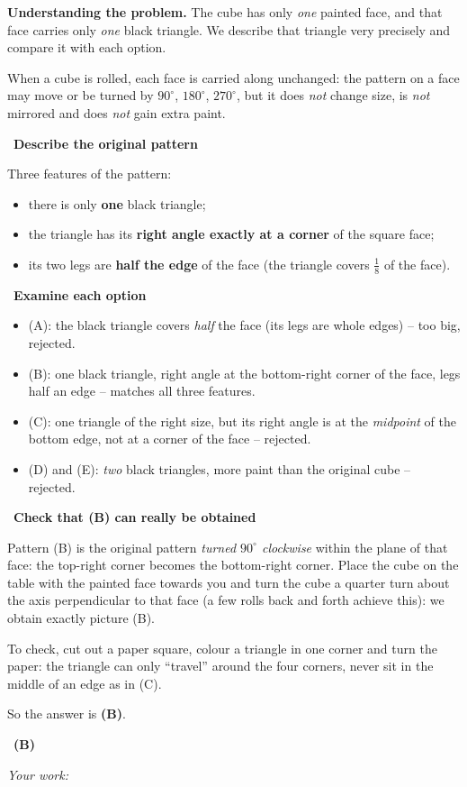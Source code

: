 \documentclass[11pt]{article}
\newif\ifsol \solfalse
\providecommand{\AnsWord}{Đáp số}
\newcommand{\ans}[1]{\par\smallskip{\bfseries\color{tmGreen!88!black}\AnsWord:}\ {\bfseries\color{AnsRed}#1}\par}
\newcommand{\probsol}[1]{%
  \begin{lrbox}{\solmeasure}\begin{minipage}{\dimexpr\linewidth-24pt\relax}#1\end{minipage}\end{lrbox}%
  \ifsol
    \begin{solbox}#1\end{solbox}%
  \else
    \setlength{\solht}{\dimexpr\ht\solmeasure+\dp\solmeasure+0.85cm\relax}%
    \ifdim\solht<1.35cm\setlength{\solht}{1.35cm}\fi
    \ifdim\solht>\StudentMaxWork\setlength{\solht}{\StudentMaxWork}\fi
    \begin{tcolorbox}[colback=white,colframe=Line,boxrule=0.8pt,arc=5pt,
      left=8pt,right=8pt,top=4pt,bottom=4pt,height=\solht]{\footnotesize\color{Slate}\itshape\WorkWord}\end{tcolorbox}%
  \fi}
\newlength{\StudentMaxWork}\setlength{\StudentMaxWork}{7.5cm}
\newcommand{\step}[2]{\par\smallskip\noindent{\bfseries\color{tmBlue!85!black}\StepWord~#1.}\ {\bfseries #2}\par\nopagebreak}
\def\WorkWord{Your work:}
\def\AnsWord{Answer}
\def\StepWord{Step}
\begin{document}
\probsol{
\textbf{Understanding the problem.} The cube has only \emph{one} painted face, and that face carries only \emph{one} black triangle. We describe that triangle very precisely and compare it with each option.
\begin{recallbox}When a cube is rolled, each face is carried along unchanged: the pattern on a face may move or be turned by $90^\circ$, $180^\circ$, $270^\circ$, but it does \emph{not} change size, is \emph{not} mirrored and does \emph{not} gain extra paint.\end{recallbox}
\step{1}{Describe the original pattern}
Three features of the pattern:
\begin{itemize}[leftmargin=1.3em,itemsep=0pt,topsep=0pt]
  \item there is only \textbf{one} black triangle;
  \item the triangle has its \textbf{right angle exactly at a corner} of the square face;
  \item its two legs are \textbf{half the edge} of the face (the triangle covers $\frac18$ of the face).
\end{itemize}

\step{2}{Examine each option}
\begin{itemize}[leftmargin=1.3em,itemsep=1pt,topsep=0pt]
  \item (A): the black triangle covers \emph{half} the face (its legs are whole edges) -- too big, rejected.
  \item (B): one black triangle, right angle at the bottom-right corner of the face, legs half an edge -- matches all three features.
  \item (C): one triangle of the right size, but its right angle is at the \emph{midpoint} of the bottom edge, not at a corner of the face -- rejected.
  \item (D) and (E): \emph{two} black triangles, more paint than the original cube -- rejected.
\end{itemize}

\step{3}{Check that (B) can really be obtained}
Pattern (B) is the original pattern \emph{turned $90^\circ$ clockwise} within the plane of that face: the top-right corner becomes the bottom-right corner. Place the cube on the table with the painted face towards you and turn the cube a quarter turn about the axis perpendicular to that face (a few rolls back and forth achieve this): we obtain exactly picture (B).
\begin{tipbox}To check, cut out a paper square, colour a triangle in one corner and turn the paper: the triangle can only ``travel'' around the four corners, never sit in the middle of an edge as in (C).\end{tipbox}
So the answer is \textbf{(B)}.
\ans{(B)}
}
\end{document}
